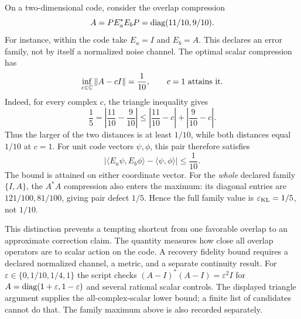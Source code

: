 On a two-dimensional code, consider the overlap compression
\[
A=PE_a^*E_bP=\operatorname{diag}(11/10,9/10).
\]
For instance, within the code take $E_a=I$ and $E_b=A$. This declares an error family, not by itself a normalized noise channel. The optimal scalar compression has
\[
\inf_{c\in\CC}\norm{A-cI}=\frac1{10},\qquad c=1\ \text{attains it}.
\]
Indeed, for every complex $c$, the triangle inequality gives
\[
\frac15=\left|\frac{11}{10}-\frac9{10}\right|
\leq\left|\frac{11}{10}-c\right|+\left|\frac9{10}-c\right|.
\]
Thus the larger of the two distances is at least $1/10$, while both distances equal $1/10$ at $c=1$.
For unit code vectors $\psi,\phi$, this pair therefore satisfies
\[
\left|\langle E_a\psi,E_b\phi\rangle-\langle\psi,\phi\rangle\right|
\leq\frac1{10}.
\]
The bound is attained on either coordinate vector. For the \emph{whole} declared family $\{I,A\}$, the $A^*A$ compression also enters the maximum: its diagonal entries are $121/100,81/100$, giving pair defect $1/5$. Hence the full family value is $\varepsilon_{\rm KL}=1/5$, not $1/10$.

This distinction prevents a tempting shortcut from one favorable overlap to an approximate correction claim. The quantity measures how close all overlap operators are to scalar action on the code. A recovery fidelity bound requires a declared normalized channel, a metric, and a separate continuity result.
For $\varepsilon\in\{0,1/10,1/4,1\}$ the script checks $(A-I)^*(A-I)=\varepsilon^2I$ for $A=\operatorname{diag}(1+\varepsilon,1-\varepsilon)$ and several rational scalar controls. The displayed triangle argument supplies the all-complex-scalar lower bound; a finite list of candidates cannot do that. The family maximum above is also recorded separately.

